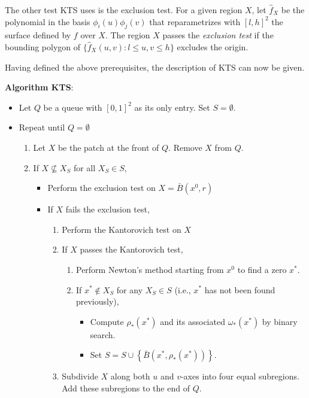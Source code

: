 \documentclass[12pt]{article}
\begin{document}
The other test KTS uses is the exclusion test. For a
given region $X$, let $\hat{f}_X$ be the polynomial in the basis
$\phi_i(u)\phi_j(v)$ that reparametrizes with $[l,h]^2$ the
surface defined by $f$ over $X$.  The region $X$ passes the
\emph{exclusion test} if the bounding polygon of $\{
\hat{f}_X(u,v) : l \leq u,v \leq h \}$ excludes the origin.

Having defined the above prerequisites, the description of KTS
can now be given.

\begin{flushleft}
\textbf{Algorithm KTS}:
\end{flushleft}
\begin{itemize}
\item Let $Q$ be a queue with $[0,1]^2$ as its only entry. Set $S = \emptyset$.
\item Repeat until $Q = \emptyset$
\begin{enumerate}
\item Let $X$ be the patch at the front of $Q$.  Remove $X$ from $Q$.
\item If $X \not\subseteq X_S$ for all $X_S \in S$,
\begin{itemize}
\item Perform the exclusion test on $X=\bar{B}(x^0,r)$
\item If $X$ fails the exclusion test,
\begin{enumerate}
\item Perform the Kantorovich test on $X$
\item If $X$ passes the Kantorovich test,
\begin{enumerate}
\item Perform Newton's method starting from $x^0$ to find a zero $x^*$.
\item If $x^* \not\in X_S$ for any $X_S \in S$ (i.e., $x^*$ has not been found previously),
\begin{itemize}
\item Compute $\rho_*(x^*)$ and its associated $\omega_*(x^*)$ by binary search.
\item Set $S = S \cup \left\{\bar{B}(x^*,\rho_*(x^*))\right\}$.
\end{itemize}
\end{enumerate}
\item Subdivide $X$ along both $u$ and $v$-axes into four equal subregions. Add these subregions
to the end of $Q$.
\end{enumerate}
\end{itemize}
\end{enumerate}
\end{itemize}
\end{document}

